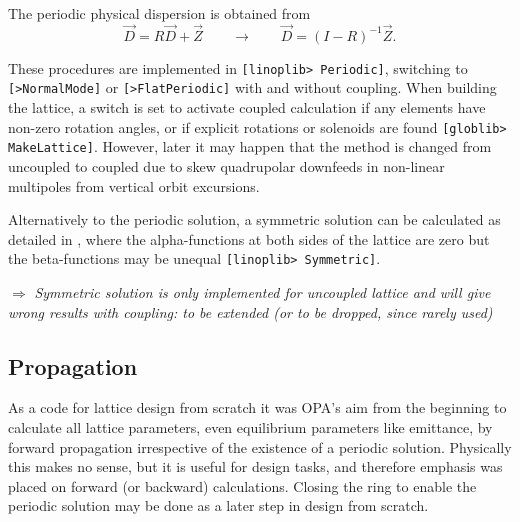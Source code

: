 \documentclass[12pt]{article}
\newcommand\beq{\begin{equation}}
\newcommand\eeq{\end{equation}}
\newcommand\todo[1]{$\Longrightarrow$ {\em #1} }
\newcommand\code[1]{{\tt [#1]}}
\begin{document}
The periodic physical dispersion is obtained from
\beq
\vec{D}=R \vec{D}+\vec{Z} \qquad \longrightarrow \qquad \vec{D}=(I-R)^{-1} \vec{Z}.
\eeq

These procedures are implemented in \code{linoplib> Periodic}, switching to \code{>NormalMode} or \code{>FlatPeriodic} with and without coupling.
When building the lattice, a switch is set to activate coupled calculation if any elements have non-zero rotation angles, or if explicit rotations or solenoids are found \code{globlib> MakeLattice}. However, later it may happen that the method is changed from uncoupled to coupled due to skew quadrupolar downfeeds in non-linear multipoles from vertical orbit excursions.

Alternatively to the periodic solution, a symmetric solution can be calculated as detailed in \cite{wille}, where the alpha-functions at both sides of the lattice are zero but the beta-functions may be unequal \code{linoplib> Symmetric}.

\todo{Symmetric solution is only implemented for uncoupled lattice and will give wrong results with coupling: to be extended (or to be dropped, since rarely used)}

\subsection{Propagation}
As a code for lattice design from scratch it was OPA's aim from the beginning to calculate all lattice parameters, even equilibrium parameters like emittance, by forward propagation irrespective of the existence of a periodic solution. Physically this makes no sense, but it is useful for design tasks, and therefore emphasis was placed on forward (or backward) calculations. Closing the ring to enable the periodic solution may be done as a later step in design from scratch.
\end{document}
